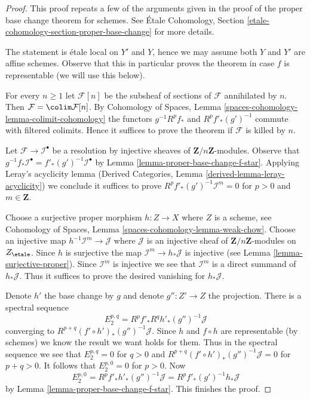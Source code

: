 \begin{proof}
This proof repeats a few of the arguments given in the proof of the
proper base change theorem for schemes. See
\'Etale Cohomology, Section \ref{etale-cohomology-section-proper-base-change}
for more details.

\medskip\noindent
The statement is \'etale local on $Y'$ and $Y$, hence we may assume
both $Y$ and $Y'$ are affine schemes. Observe that this in particular
proves the theorem in case $f$ is representable (we will use this
below).

\medskip\noindent
For every $n \geq 1$ let $\mathcal{F}[n]$ be the subsheaf of sections
of $\mathcal{F}$ annihilated by $n$. Then
$\mathcal{F} = \colim \mathcal{F}[n]$. By 
Cohomology of Spaces, Lemma \ref{spaces-cohomology-lemma-colimit-cohomology}
the functors $g^{-1}R^pf_*$ and $R^pf'_*(g')^{-1}$ commute
with filtered colimits. Hence it suffices to prove the theorem
if $\mathcal{F}$ is killed by $n$.

\medskip\noindent
Let $\mathcal{F} \to \mathcal{I}^\bullet$ be a resolution by
injective sheaves of $\mathbf{Z}/n\mathbf{Z}$-modules.
Observe that
$g^{-1}f_*\mathcal{I}^\bullet = f'_*(g')^{-1}\mathcal{I}^\bullet$
by Lemma \ref{lemma-proper-base-change-f-star}.
Applying Leray's acyclicity lemma
(Derived Categories, Lemma \ref{derived-lemma-leray-acyclicity})
we conclude it suffices to prove
$R^pf'_*(g')^{-1}\mathcal{I}^m = 0$ for $p > 0$ and $m \in \mathbf{Z}$.

\medskip\noindent
Choose a surjective proper morphism
$h : Z \to X$ where $Z$ is a scheme, see
Cohomology of Spaces, Lemma \ref{spaces-cohomology-lemma-weak-chow}.
Choose an injective map $h^{-1}\mathcal{I}^m \to \mathcal{J}$
where $\mathcal{J}$ is an injective sheaf of
$\mathbf{Z}/n\mathbf{Z}$-modules on $Z_\etale$.
Since $h$ is surjective the map $\mathcal{I}^m \to h_*\mathcal{J}$
is injective (see Lemma \ref{lemma-surjective-proper}).
Since $\mathcal{I}^m$ is injective we see that $\mathcal{I}^m$
is a direct summand of $h_*\mathcal{J}$. Thus it suffices
to prove the desired vanishing for $h_*\mathcal{J}$.

\medskip\noindent
Denote $h'$ the base change by $g$ and denote $g'' : Z' \to Z$
the projection. There is a spectral sequence
$$
E_2^{p, q} = R^pf'_* R^qh'_* (g'')^{-1}\mathcal{J}
$$
converging to $R^{p + q}(f' \circ h')_*(g'')^{-1}\mathcal{J}$.
Since $h$ and $f \circ h$ are representable (by schemes)
we know the result we want holds for them. Thus in the
spectral sequence we see that $E_2^{p, q} = 0$ for $q > 0$
and $R^{p + q}(f' \circ h')_*(g'')^{-1}\mathcal{J} = 0$
for $p + q > 0$. It follows that $E_2^{p, 0} = 0$ for $p > 0$.
Now
$$
E_2^{p, 0} = R^pf'_* h'_* (g'')^{-1}\mathcal{J} =
R^pf'_* (g')^{-1}h_*\mathcal{J}
$$
by Lemma \ref{lemma-proper-base-change-f-star}. This finishes the proof.
\end{proof}
